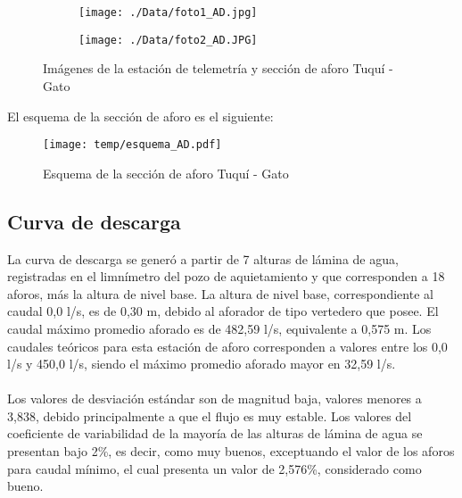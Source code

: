 \documentclass[]{article}
\begin{document}
\begin{figure}[H]
  \centering
\begin{subfigure}{.49\textwidth}
  \texttt{[image: ./Data/foto1\_AD.jpg]}
\end{subfigure}
\hfill
\begin{subfigure}{.49\textwidth}
  \texttt{[image: ./Data/foto2\_AD.JPG]}
\end{subfigure}
\caption{Imágenes de la estación de telemetría y sección de aforo Tuquí - Gato}
\label{fig:fotos_4}
\end{figure}

El esquema de la sección de aforo es el siguiente:

\begin{figure}[H]
  \centering
  \texttt{[image: temp/esquema\_AD.pdf]}
\caption{Esquema de la sección de aforo Tuquí - Gato}
\label{fig:Esquema_AD}
\end{figure}

\subsection{Curva de descarga}\label{curva-de-descarga-3}

La curva de descarga se generó a partir de 7 alturas de lámina de agua, registradas en el limnímetro del pozo de aquietamiento y que corresponden a 18 aforos, más la altura de nivel base. La altura de nivel base, correspondiente al caudal 0,0 l/s, es de 0,30 m, debido al aforador de tipo vertedero que posee. El caudal máximo promedio aforado es de 482,59 l/s, equivalente a 0,575 m. Los caudales teóricos para esta estación de aforo corresponden a valores entre los 0,0 l/s y 450,0 l/s, siendo el máximo promedio aforado mayor en 32,59 l/s.\\
\\
Los valores de desviación estándar son de magnitud baja, valores menores a 3,838, debido principalmente a que el flujo es muy estable. Los valores del coeficiente de variabilidad de la mayoría de las alturas de lámina de agua se presentan bajo 2\%, es decir, como muy buenos, exceptuando el valor de los aforos para caudal mínimo, el cual presenta un valor de 2,576\%, considerado como bueno. 
\end{document}
